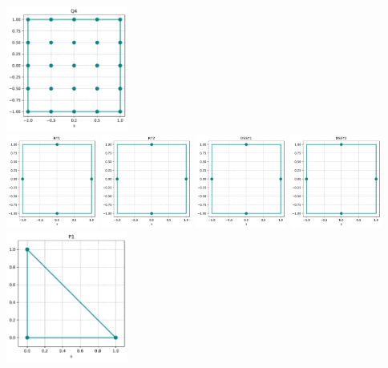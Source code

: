 \begin{center}
\includegraphics[width=4cm]{python_codes/fieldstone_120/spaces/Q4_nodes}\\
\includegraphics[width=3cm]{python_codes/fieldstone_120/spaces/RT1_nodes}
\includegraphics[width=3cm]{python_codes/fieldstone_120/spaces/RT2_nodes}
\includegraphics[width=3cm]{python_codes/fieldstone_120/spaces/DSSY1_nodes}
\includegraphics[width=3cm]{python_codes/fieldstone_120/spaces/DSSY2_nodes}\\
\includegraphics[width=4cm]{python_codes/fieldstone_120/spaces/P1_nodes}

\end{center}
